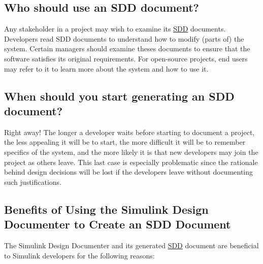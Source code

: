 \documentclass{mcscert}
\newcommand{\simulink}{Simulink}
\newcommand{\sddtool}{Simulink Design Documenter}
\begin{document}
\subsection{Who should use an SDD document?}
Any stakeholder in a project may wish to examine its \hyperref[acr:sdd]{SDD} documents. 
Developers read SDD documents to understand how to modify (parts of) the system.
Certain managers should examine theses documents to ensure that the software 
satisfies its original requirements. 
For open-source projects, 
end users may refer to it to learn more about the system and how to use it.
    
\subsection{When should you start generating an SDD document?}
Right away! 
The longer a developer waits before starting to document a project, 
the less appealing it will be to start, 
the more difficult it will be to remember specifics of the system, 
and the more likely it is that new developers may join the project as others 
leave. 
This last case is especially problematic since the rationale behind design 
decisions will be lost if the developers leave without documenting such 
justifications.
  	
\subsection{Benefits of Using the \sddtool{} to Create an SDD Document}
The \sddtool{} and its generated \hyperref[acr:sdd]{SDD} document are beneficial to \simulink{} 
developers for the following reasons:
\end{document}
